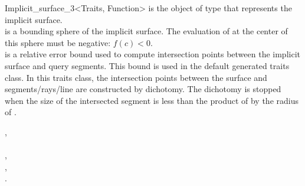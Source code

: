 \begin{ccRefClass}{Implicit_surface_3<Traits, Function>}
{ is the object of type  that represents the implicit
  surface.\\
  is a bounding sphere of the implicit surface. The
 evaluation of  at the center  of this sphere must be
 negative: $f(c)<0$.\\
  is a relative error bound 
used to  compute intersection points between the implicit surface
and  query segments. This bound is used in  the default generated traits class.
In this traits class, the intersection points between
the surface and segments/rays/line are constructed by dichotomy. The
dichotomy is stopped when the size of the intersected
segment  is less than the  product of  by the
radius of .}

\ccSeeAlso
{},\\
 \\
,\\
, \\
.

\end{ccRefClass}


